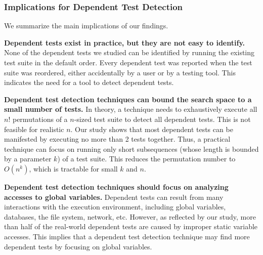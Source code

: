 

\subsubsection{Implications for Dependent Test Detection}

We summarize the main implications of our findings.

\noindent \textbf{{Dependent tests exist in practice, but
they are not easy to identify.}}
None of the dependent tests we studied can be identified by
running the existing test suite in the default order. 
Every dependent test was reported when the
test suite was reordered, either accidentally by a user or
by a testing tool. This indicates the need
for a tool to detect dependent tests.

\vspace{1mm}
\noindent \textbf{Dependent test detection techniques
can bound the search space to a small number of tests.}
In theory, a technique needs to exhaustively execute
all $n!$ permutations of a $n$-sized
test suite to detect all dependent tests. This is
not feasible for realistic $n$.  Our study shows that
most dependent tests can be manifested by executing
no more than 2 tests together. Thus, a practical technique
can focus on running only short subsequences (whose
length is bounded by a parameter $k$)
of a test suite. This reduces the permutation number 
to $O(n^k)$, which is tractable for small $k$ and $n$.

\vspace{1mm}
\noindent \textbf{Dependent test detection techniques
should focus on analyzing accesses to global variables.}
Dependent tests can result from many
interactions with the execution environment, including
global variables, databases, the file system, network, etc.
However, as reflected by our study, more than half of the
real-world dependent tests are caused
by improper static variable accesses. This implies that a dependent
test detection technique may find more dependent tests
by focusing on global variables.




